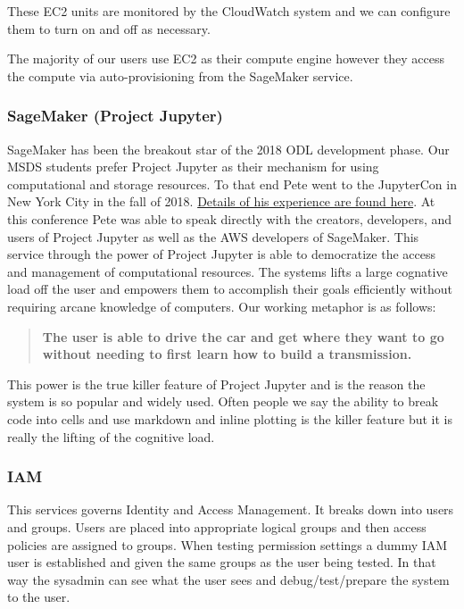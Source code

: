 These EC2 units are monitored by the CloudWatch system and we can configure them to turn on and off as necessary.

The majority of our users use EC2 as their compute engine however they access the compute via auto-provisioning from the SageMaker service.


\subsubsection{SageMaker (Project Jupyter)}
\label{sec:projectjupyter}

SageMaker has been the breakout star of the 2018 ODL development phase. Our MSDS students prefer Project Jupyter as their mechanism for using computational and storage resources. To that end Pete went to the JupyterCon in New York City in the fall of 2018. \href{https://github.com/UVA-DSI/conferences/tree/master/JupyterCon18}{Details of his experience are found here}.
At this conference Pete was able to speak directly with the creators, developers, and users of Project Jupyter as well as the AWS developers of SageMaker. This service through the power of Project Jupyter is able to democratize the access and management of computational resources. The systems lifts a large cognative load off the user and empowers them to accomplish their goals efficiently without requiring arcane knowledge of computers. Our working metaphor is as follows:

\begin{quote}
\textbf{
The user is able to drive the car and get where they want to go without needing to first learn how to build a transmission.
}
\end{quote}

This power is the true killer feature of Project Jupyter and is the reason the system is so popular and widely used. Often people we say the ability to break code into cells and use markdown and inline plotting is the killer feature but it is really the lifting of the cognitive load.

\subsubsection{IAM}
This services governs Identity and Access Management. It breaks down into users and groups. Users are placed into appropriate logical groups and then access policies are assigned to groups.
When testing permission settings a dummy IAM user is established and given the same groups as the user being tested. In that way the sysadmin can see what the user sees and debug/test/prepare the system to the user.
